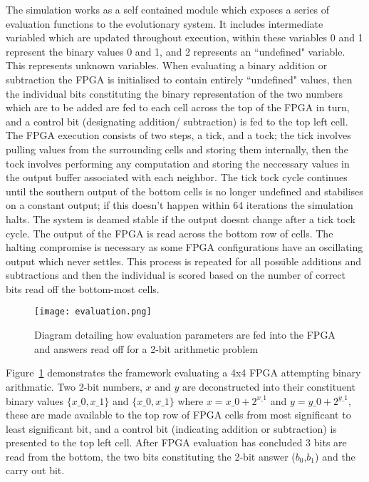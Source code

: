 The simulation works as a self contained module which exposes a series of
evaluation functions to the evolutionary system.
It includes intermediate variabled which are updated throughout
execution, within these variables 0 and 1 represent the binary values
0 and 1, and 2 represents an ``undefined" variable. This represents
unknown variables.
When evaluating a binary
addition or subtraction the FPGA is initialised to contain entirely ``undefined"
values, then the individual bits constituting the binary representation of the two numbers
which are to be added are fed
to each cell across the top of the FPGA in turn, and a control bit (designating addition/
subtraction) is fed to the top left cell. The FPGA execution consists of
two steps, a tick, and a tock; the tick involves pulling values from the surrounding
cells and storing them internally, then the tock involves performing any computation
and storing the neccessary values in the output buffer associated with each neighbor.
The tick tock
cycle continues until the southern output of the bottom cells is no longer undefined
and stabilises on a constant output; if this doesn't happen within 64 iterations
the simulation halts. The system is deamed stable if the output doesnt change after
a tick tock cycle.
The output of the FPGA is read across the bottom row of cells.
The halting compromise is necessary as some FPGA configurations
have an oscillating output which never settles. This process is repeated for all possible
additions and subtractions and then the individual is scored based on the number
of correct bits read off the bottom-most cells.

\begin{figure}
\centering
\texttt{[image: evaluation.png]}
\caption{Diagram detailing how evaluation parameters are fed into the FPGA and answers
read off for a 2-bit arithmetic problem}
\label{fig:control}
\end{figure}

Figure~\ref{fig:control} demonstrates the framework evaluating a 4x4 FPGA attempting
binary arithmatic. Two 2-bit numbers, $x$ and $y$ are deconstructed into their constituent
binary values $\{x\_0,x\_1\}$ and $\{x\_0,x\_1\}$ where $x = x\_0 + 2^{x\_1}$ and $y = y\_0 + 2^{y\_1}$,
these are made available
to the top row of FPGA cells from most significant to least significant bit, and a
control bit (indicating addition or subtraction) is presented to the top left cell.
After FPGA evaluation has concluded 3 bits are read from the bottom, the two bits
constituting the 2-bit answer ($b_0$,$b_1$) and the carry out bit.


